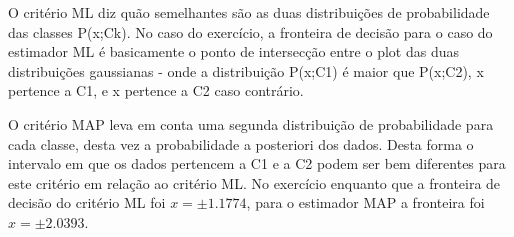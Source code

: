 \documentclass[a4paper, 12pt]{article}
\begin{document}
O critério ML diz quão semelhantes são as duas distribuições de probabilidade das classes P(x;Ck).
No caso do exercício, a fronteira de decisão para o caso do estimador ML é basicamente o ponto de intersecção entre o plot das duas distribuições gaussianas - onde a distribuição P(x;C1) é maior que P(x;C2), x pertence a C1, e x pertence a C2 caso contrário.

O critério MAP leva em conta uma segunda distribuição de probabilidade para cada classe, desta vez a probabilidade a posteriori dos dados.
Desta forma o intervalo em que os dados pertencem a C1 e a C2 podem ser bem diferentes para este critério em relação ao critério ML.
No exercício enquanto que a fronteira de decisão do critério ML foi $x = \pm 1.1774$, para o estimador MAP a fronteira foi $x = \pm 2.0393$.
\end{document}
